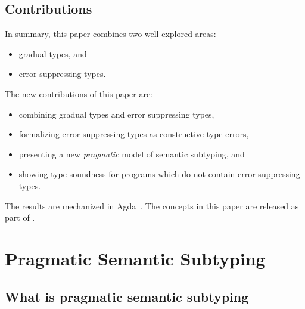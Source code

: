 \documentclass[acmsmall,review,screen]{acmart}
\begin{document}
\subsection{Contributions}

In summary, this paper combines two well-explored areas:
\begin{itemize}
  \item gradual types, and
  \item error suppressing types.
\end{itemize}
The new contributions of this paper are:
\begin{itemize}
  \item combining gradual types and error suppressing types,
  \item formalizing error suppressing types as constructive type errors,
  \item presenting a new \emph{pragmatic} model of semantic subtyping, and
  \item showing type soundness for programs which do not contain error
    suppressing types.
\end{itemize}
The results are mechanized in Agda~.
The concepts in this paper are released as part of
.

\section{Pragmatic Semantic Subtyping}
\label{sec:semsub}

\subsection{What is pragmatic semantic subtyping}
\end{document}
